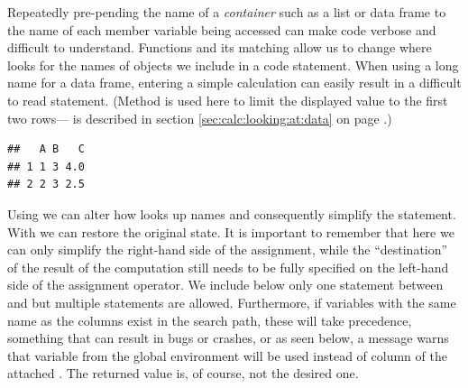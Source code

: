 \documentclass[krantz2]{krantz}\usepackage{knitr}
\begin{document}
\begin{explainbox}
Repeatedly pre-pending the name of a \emph{container} such as a list or data frame to the name of each member variable being accessed can make \Rlang code verbose and difficult to understand. Functions  and its matching  allow us to change where \Rlang looks for the names of objects we include in a code statement.
When using a long name for a data frame, entering a simple calculation can easily result in a difficult to read statement. (Method  is used here to limit the displayed value to the first two rows--- is described in section \ref{sec:calc:looking:at:data} on page \pageref{sec:calc:looking:at:data}.)

\begin{knitrout}\footnotesize
{}\color{fgcolor}\begin{kframe}
\begin{alltt}
 \hlkwb{<-} \hlstd{(} \hlstd{=} \hlopt{:}\hlstd{,}  \hlstd{=} \hlstd{)}
\hlopt{$} \hlkwb{<-}
  \hlopt{$} \hlopt{+} \hlopt{$} \hlopt{/} \hlopt{$}
 \hlstd{)}
\end{alltt}
\begin{verbatim}
##   A B   C
## 1 1 3 4.0
## 2 2 3 2.5
\end{verbatim}
\end{kframe}
\end{knitrout}

Using  we can alter how \Rlang looks up names and consequently simplify the statement. With  we can restore the original state. It is important to remember that here we can only simplify the right-hand side of the assignment, while the ``destination'' of the result of the computation still needs to be fully specified on the left-hand side of the assignment operator. We include below only one statement between  and  but multiple statements are allowed. Furthermore, if variables with the same name as the columns exist in the search path, these will take precedence, something that can result in bugs or crashes, or as seen below, a message warns that variable  from the global environment will be used instead of column  of the attached . The returned value is, of course, not the desired one.


\end{explainbox}
\end{document}
